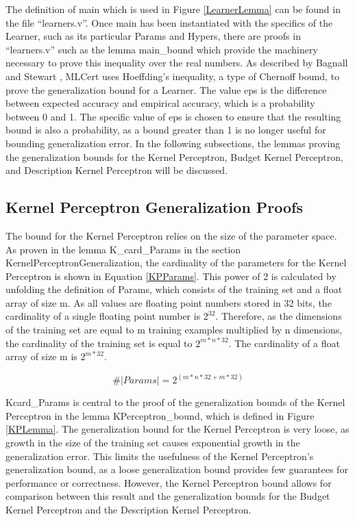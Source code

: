 The definition of main which is used in Figure \ref{LearnerLemma} can be found in the file ``learners.v''. Once main has been instantiated with the specifics of the Learner, such as its particular Params and Hypers, there are proofs in ``learners.v'' such as the lemma main\_bound which provide the machinery necessary to prove this inequality over the real numbers. As described by Bagnall and Stewart \cite{BS19}, MLCert uses Hoeffding's inequality, a type of Chernoff bound, to prove the generalization bound for a Learner. The value eps is the difference between expected accuracy and empirical accuracy, which is a probability between 0 and 1. The specific value of eps is chosen to ensure that the resulting bound is also a probability, as a bound greater than 1 is no longer useful for bounding generalization error. In the following subsections, the lemmas proving the generalization bounds for the Kernel Perceptron, Budget Kernel Perceptron, and Description Kernel Perceptron will be discussed.
\subsection{Kernel Perceptron Generalization Proofs}\label{KPProofs}
The bound for the Kernel Perceptron relies on the size of the parameter space. As proven in the lemma K\_card\_Params in the section KernelPerceptronGeneralization, the cardinality of the parameters for the Kernel Perceptron is shown in Equation \ref{KPParams}. This power of 2 is calculated by unfolding the definition of Params, which consists of the training set and a float array of size m. As all values are floating point numbers stored in 32 bits, the cardinality of a single floating point number is $2^{32}$. Therefore, as the dimensions of the training set are equal to m training examples multiplied by n dimensions, the cardinality of the training set is equal to $2^{m*n*32}$. The cardinality of a float array of size m is $2^{m * 32}$. 

\begin{equation} \label{KPParams}
 \#|Params| = 2^{(m*n*32 + m*32)}
\end{equation}

Kcard\_Params is central to the proof of the generalization bounds of the Kernel Perceptron in the lemma KPerceptron\_bound, which is defined in Figure \ref{KPLemma}. The generalization bound for the Kernel Perceptron is very loose, as growth in the size of the training set causes exponential growth in the generalization error. This limits the usefulness of the Kernel Perceptron's generalization bound, as a loose generalization bound provides few guarantees for performance or correctness. However, the Kernel Perceptron bound allows for comparison between this result and the generalization bounds for the Budget Kernel Perceptron and the Description Kernel Perceptron. 

